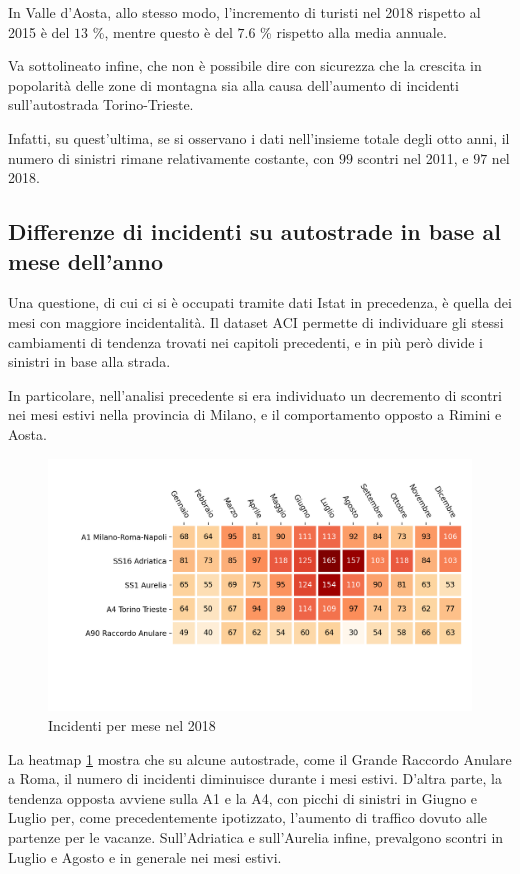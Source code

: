 \documentclass[a4paper,12pt]{report}
\begin{document}
In Valle d'Aosta, allo stesso modo, l'incremento di turisti nel 2018 
rispetto al 2015 è del $13$ \%, mentre questo è del $7.6$ \% rispetto alla media annuale. 

Va sottolineato infine, che non è possibile dire con sicurezza che 
la crescita in popolarità delle zone di montagna sia alla causa dell'aumento 
di incidenti sull'autostrada Torino-Trieste. 

Infatti, su quest'ultima, se si osservano i dati nell'insieme totale degli otto anni, 
il numero di sinistri rimane relativamente costante, 
con $99$ scontri nel 2011, e $97$ nel 2018. 

\subsection{Differenze di incidenti su autostrade in base al mese dell'anno}

Una questione, di cui ci si è occupati tramite dati Istat in precedenza, è 
quella dei mesi con maggiore incidentalità. 
Il dataset ACI permette di individuare gli stessi cambiamenti di tendenza trovati nei 
capitoli precedenti, e in più però divide i sinistri in base alla strada. 

In particolare, nell'analisi precedente si era individuato un decremento di scontri 
nei mesi estivi nella provincia di Milano, e il comportamento opposto a 
Rimini e Aosta. 

\begin{figure}
    \includegraphics[width=\linewidth]{../src/incidenti/incidenti_aci/autostrade/mesi_autostrade.png}
    \caption{Incidenti per mese nel 2018}
    \label{fig:incidenti-per-mese}
\end{figure}

La heatmap \ref{fig:incidenti-per-mese} mostra che su alcune autostrade, come il 
Grande Raccordo Anulare a Roma, il numero di incidenti diminuisce durante i mesi 
estivi. 
D'altra parte, la tendenza opposta avviene sulla A1 e la A4, 
con picchi di sinistri in Giugno e Luglio per, come precedentemente ipotizzato, 
l'aumento di traffico dovuto alle partenze per le vacanze. 
Sull'Adriatica e sull'Aurelia infine, prevalgono scontri 
in Luglio e Agosto e in generale nei mesi estivi. 
\end{document}
